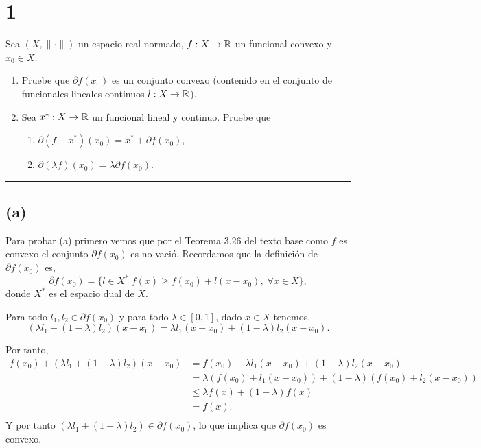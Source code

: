 \section*{1}

Sea $(X, \| \cdot \|)$ un espacio real normado, $f : X \rightarrow \mathbb{R}$ un funcional convexo y $x_0 \in X$.
\begin{enumerate}[label=(\alph*)]
    \item Pruebe que $\partial f(x_0)$ es un conjunto convexo (contenido en el conjunto de funcionales lineales continuos $l : X \rightarrow \mathbb{R}$). 
    \item Sea $x^*: X \rightarrow \mathbb{R}$ un funcional lineal y continuo. Pruebe que
        \begin{enumerate}[label=(\alph{enumi}.\arabic*)]
            \item $\partial (f + x^*)(x_0) = x^* + \partial f(x_0)$, 
            \item $\partial (\lambda f)(x_0) = \lambda \partial f(x_0)$.
        \end{enumerate}
\end{enumerate}

\noindent\rule{10cm}{0.4pt}


\subsection*{(a)}

Para probar (a) primero vemos que por el Teorema 3.26 del texto base como $f$ es convexo el conjunto $\partial f(x_0)$ es no vació.
Recordamos que la definición de $\partial f(x_0)$ es,
\begin{equation*}
    \partial f(x_0) = \{ l \in X^* | f(x) \geq f(x_0) + l(x - x_0),\; \forall x \in X \},
\end{equation*}
donde $X^*$ es el espacio dual de $X$.

Para todo $l_1, l_2 \in \partial f(x_0)$ y para todo $\lambda \in [0,1]$,
dado $x \in X$ tenemos,
\begin{equation*}
    (\lambda l_1 + (1 - \lambda) l_2) (x - x_0) = \lambda l_1 (x - x_0) + (1 - \lambda) l_2 (x - x_0).
\end{equation*}

Por tanto,
\begin{equation*}
\begin{aligned}
    f(x_0) + (\lambda l_1 + (1 - \lambda) l_2) (x - x_0) 
        & = f(x_0) + \lambda l_1 (x - x_0) + (1 - \lambda) l_2 (x - x_0) \\
        & = \lambda (f(x_0) + l_1 (x - x_0)) + (1 - \lambda) (f(x_0) + l_2 (x - x_0)) \\
        & \leq \lambda f(x) + (1 - \lambda) f(x) \\
        & = f(x). \\
\end{aligned}
\end{equation*}
Y por tanto $(\lambda l_1 + (1 - \lambda) l_2) \in \partial f(x_0)$, lo que implica que $\partial f(x_0)$ es convexo.


